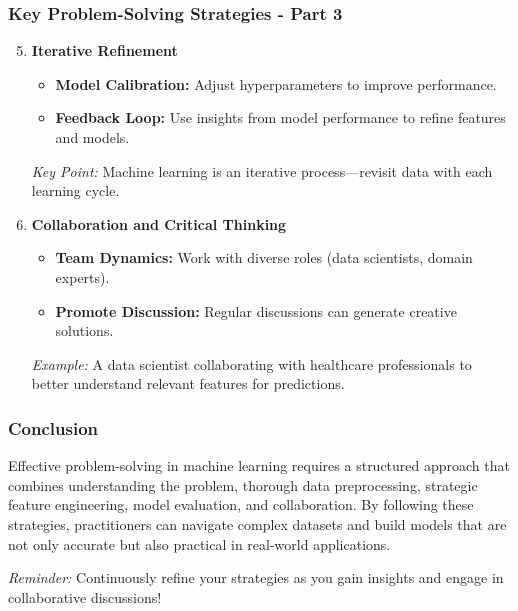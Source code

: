 \documentclass[aspectratio=169]{beamer}
\begin{document}
\begin{frame}[fragile]
    \frametitle{Key Problem-Solving Strategies - Part 3}
    \begin{enumerate}
        \setcounter{enumi}{4}
        \item \textbf{Iterative Refinement}
            \begin{itemize}
                \item \textbf{Model Calibration:} Adjust hyperparameters to improve performance.
                \item \textbf{Feedback Loop:} Use insights from model performance to refine features and models.
            \end{itemize}
            \pause
            \textit{Key Point:} Machine learning is an iterative process—revisit data with each learning cycle.

        \item \textbf{Collaboration and Critical Thinking}
            \begin{itemize}
                \item \textbf{Team Dynamics:} Work with diverse roles (data scientists, domain experts).
                \item \textbf{Promote Discussion:} Regular discussions can generate creative solutions.
            \end{itemize}
            \pause
            \textit{Example:} A data scientist collaborating with healthcare professionals to better understand relevant features for predictions.
    \end{enumerate}
\end{frame}

\begin{frame}[fragile]
    \frametitle{Conclusion}
    Effective problem-solving in machine learning requires a structured approach that combines understanding the problem, thorough data preprocessing, strategic feature engineering, model evaluation, and collaboration. By following these strategies, practitioners can navigate complex datasets and build models that are not only accurate but also practical in real-world applications.

    \textit{Reminder:} Continuously refine your strategies as you gain insights and engage in collaborative discussions!
\end{frame}
\end{document}
